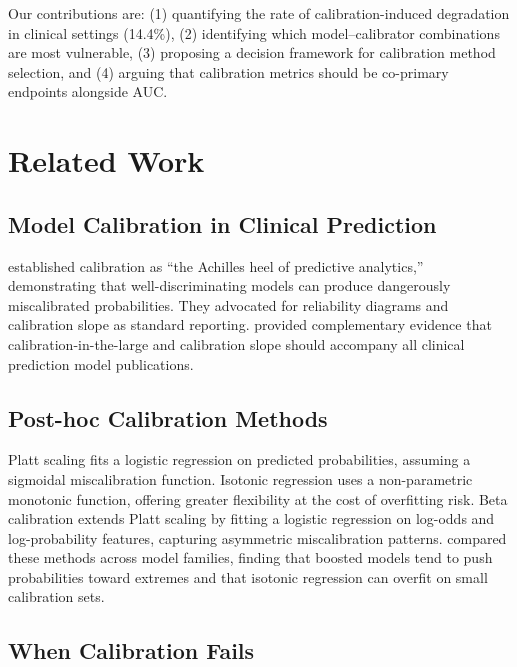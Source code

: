 \documentclass[preprint,12pt]{elsarticle}
\begin{document}
Our contributions are: (1) quantifying the rate of calibration-induced degradation in clinical settings (14.4\%), (2) identifying which model--calibrator combinations are most vulnerable, (3) proposing a decision framework for calibration method selection, and (4) arguing that calibration metrics should be co-primary endpoints alongside AUC.

\section{Related Work}
\label{sec:related}

\subsection{Model Calibration in Clinical Prediction}

\citet{vancalster2019} established calibration as ``the Achilles heel of predictive analytics,'' demonstrating that well-discriminating models can produce dangerously miscalibrated probabilities. They advocated for reliability diagrams and calibration slope as standard reporting. \citet{steyerberg2010} provided complementary evidence that calibration-in-the-large and calibration slope should accompany all clinical prediction model publications.

\subsection{Post-hoc Calibration Methods}

Platt scaling \citep{platt1999} fits a logistic regression on predicted probabilities, assuming a sigmoidal miscalibration function. Isotonic regression \citep{zadrozny2002} uses a non-parametric monotonic function, offering greater flexibility at the cost of overfitting risk. Beta calibration \citep{kull2017} extends Platt scaling by fitting a logistic regression on log-odds and log-probability features, capturing asymmetric miscalibration patterns. \citet{niculescu2005} compared these methods across model families, finding that boosted models tend to push probabilities toward extremes and that isotonic regression can overfit on small calibration sets.

\subsection{When Calibration Fails}
\end{document}
